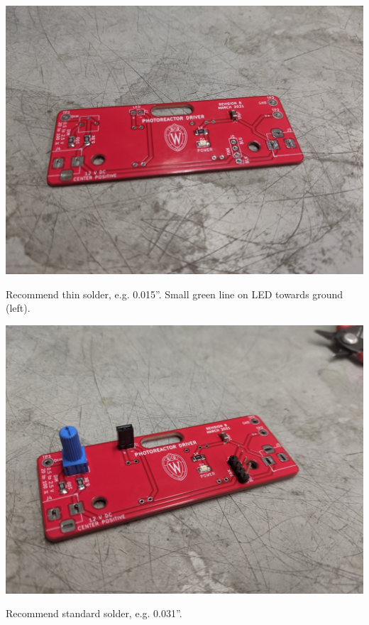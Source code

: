 \documentclass[11pt]{article}
\begin{document}
\begin{center}
  \includegraphics[width=\textwidth/2]{"./surface-mount.jpg"}
\end{center}

Recommend thin solder, e.g. 0.015''.
Small green line on LED towards ground (left).

\begin{center}
  \includegraphics[width=\textwidth/2]{"./connectors.jpg"}
\end{center}

Recommend standard solder, e.g. 0.031''.
\end{document}

